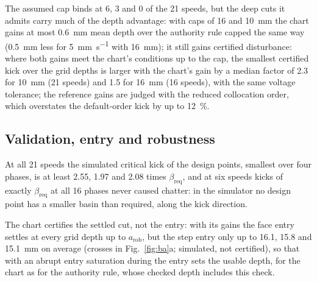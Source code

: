 The assumed cap binds at 6, 3 and 0 of the 21 speeds, but the deep cuts it admits carry much of the depth advantage: with caps of 16 and \SI{10}{\milli\metre} the chart gains at most \SI{0.6}{\milli\metre} mean depth over the authority rule capped the same way (\SI{0.5}{\milli\metre} less for \SI{5}{\milli\metre\per\second} with \SI{16}{\milli\metre}); it still gains certified disturbance: where both gains meet the chart's conditions up to the cap, the smallest certified kick over the grid depths is larger with the chart's gain by a median factor of 2.3 for \SI{10}{\milli\metre} (21 speeds) and 1.5 for \SI{16}{\milli\metre} (16 speeds), with the same voltage tolerance; the reference gains are judged with the reduced collocation order, which overstates the default-order kick by up to \SI{12}{\percent}.

\subsection{Validation, entry and robustness}\label{sec:ba-valid}

At all 21 speeds the simulated critical kick of the design points, smallest over four phases, is at least 2.55, 1.97 and 2.08 times $\beta_{\mathrm{req}}$, and at six speeds kicks of exactly $\beta_{\mathrm{req}}$ at all 16 phases never caused chatter: in the simulator no design point has a smaller basin than required, along the kick direction.

The chart certifies the settled cut, not the entry: with its gains the face entry settles at every grid depth up to $a_{\mathrm{rob}}$, but the step entry only up to 16.1, 15.8 and \SI{15.1}{\milli\metre} on average (crosses in Fig.~\ref{fig:ba}a; simulated, not certified), so that with an abrupt entry saturation during the entry sets the usable depth, for the chart as for the authority rule, whose checked depth includes this check.

